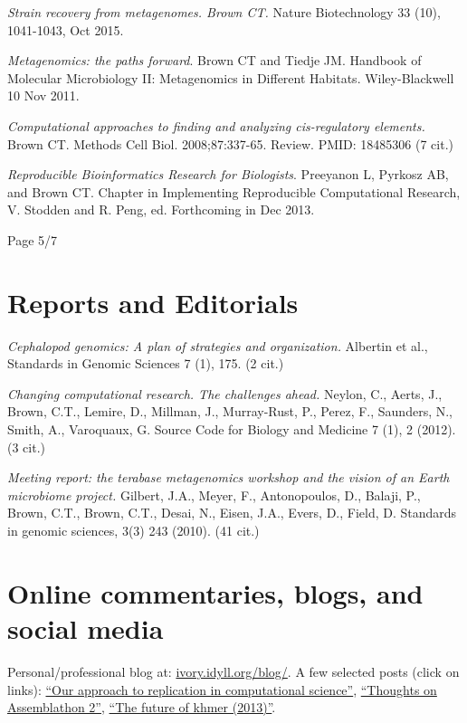 \documentclass[margin,line]{resume}
\begin{document}
\begin{resume}
{\em Strain recovery from metagenomes. Brown CT.} Nature Biotechnology
33 (10), 1041-1043, Oct 2015.

{\em Metagenomics: the paths forward}.  Brown CT and Tiedje JM.
Handbook of Molecular Microbiology II: Metagenomics in Different
Habitats.  Wiley-Blackwell 10 Nov 2011.

{\em Computational approaches to finding and analyzing cis-regulatory elements.} 
Brown CT. Methods Cell Biol. 2008;87:337-65. Review.
PMID: 18485306  (7 cit.)

{\em Reproducible Bioinformatics Research for Biologists}.  Preeyanon
L, Pyrkosz AB, and Brown CT. Chapter in Implementing Reproducible
Computational Research, V. Stodden and R. Peng, ed.  Forthcoming in
Dec 2013.

\vspace{1cm}
{\centerline {Page 5/7}}

\newpage

\section{\mysidestyle Reports and Editorials}

{\em Cephalopod genomics: A plan of strategies and organization.} Albertin et al., Standards in Genomic Sciences 7 (1), 175. (2 cit.)

{\em Changing computational research. The challenges ahead.}
Neylon, C., Aerts, J., Brown, C.T., Lemire, D., Millman, J., Murray-Rust, P., Perez, F., Saunders, N., Smith, A., Varoquaux, G.
Source Code for Biology and Medicine 7 (1), 2 (2012). (3 cit.)

{\em Meeting report: the terabase metagenomics workshop and the vision of an Earth microbiome project.}
Gilbert, J.A., Meyer, F., Antonopoulos, D., Balaji, P., Brown, C.T., Brown, C.T., Desai, N., Eisen, J.A., Evers, D., Field, D. Standards in genomic sciences, 3(3) 243 (2010). (41 cit.)

\section{\mysidestyle Online commentaries, blogs, and social media}

Personal/professional blog at: \href{http://ivory.idyll.org/blog/}{ivory.idyll.org/blog/}.  A few selected posts (click on links): \href{http://ivory.idyll.org/blog/replication-i.html}{``Our approach to replication in computational science''}, \href{http://ivory.idyll.org/blog/thoughts-on-assemblathon-2.html}{``Thoughts on Assemblathon 2''}, \href{http://ivory.idyll.org/blog/the-future-of-khmer-2013-version.html}{``The future of khmer (2013)''}.


\end{resume}
\end{document}
